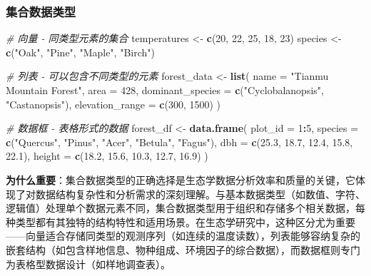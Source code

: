\documentclass[
]{book}
\newenvironment{Shaded}{\begin{snugshade}}{\end{snugshade}}
\newcommand{\AttributeTok}[1]{\textcolor[rgb]{0.13,0.29,0.53}{#1}}
\newcommand{\CommentTok}[1]{\textcolor[rgb]{0.56,0.35,0.01}{\textit{#1}}}
\newcommand{\DecValTok}[1]{\textcolor[rgb]{0.00,0.00,0.81}{#1}}
\newcommand{\FloatTok}[1]{\textcolor[rgb]{0.00,0.00,0.81}{#1}}
\newcommand{\FunctionTok}[1]{\textcolor[rgb]{0.13,0.29,0.53}{\textbf{#1}}}
\newcommand{\NormalTok}[1]{#1}
\newcommand{\OtherTok}[1]{\textcolor[rgb]{0.56,0.35,0.01}{#1}}
\newcommand{\SpecialCharTok}[1]{\textcolor[rgb]{0.81,0.36,0.00}{\textbf{#1}}}
\newcommand{\StringTok}[1]{\textcolor[rgb]{0.31,0.60,0.02}{#1}}
\begin{document}
\hypertarget{ux96c6ux5408ux6570ux636eux7c7bux578b}{%
\subsubsection{集合数据类型}\label{ux96c6ux5408ux6570ux636eux7c7bux578b}}

\begin{Shaded}
\begin{Highlighting}[]
\CommentTok{\# 向量 {-} 同类型元素的集合}
\NormalTok{temperatures }\OtherTok{\textless{}{-}} \FunctionTok{c}\NormalTok{(}\DecValTok{20}\NormalTok{, }\DecValTok{22}\NormalTok{, }\DecValTok{25}\NormalTok{, }\DecValTok{18}\NormalTok{, }\DecValTok{23}\NormalTok{)}
\NormalTok{species }\OtherTok{\textless{}{-}} \FunctionTok{c}\NormalTok{(}\StringTok{"Oak"}\NormalTok{, }\StringTok{"Pine"}\NormalTok{, }\StringTok{"Maple"}\NormalTok{, }\StringTok{"Birch"}\NormalTok{)}

\CommentTok{\# 列表 {-} 可以包含不同类型的元素}
\NormalTok{forest\_data }\OtherTok{\textless{}{-}} \FunctionTok{list}\NormalTok{(}
  \AttributeTok{name =} \StringTok{"Tianmu Mountain Forest"}\NormalTok{,}
  \AttributeTok{area =} \DecValTok{428}\NormalTok{,}
  \AttributeTok{dominant\_species =} \FunctionTok{c}\NormalTok{(}\StringTok{"Cyclobalanopsis"}\NormalTok{, }\StringTok{"Castanopsis"}\NormalTok{),}
  \AttributeTok{elevation\_range =} \FunctionTok{c}\NormalTok{(}\DecValTok{300}\NormalTok{, }\DecValTok{1500}\NormalTok{)}
\NormalTok{)}

\CommentTok{\# 数据框 {-} 表格形式的数据}
\NormalTok{forest\_df }\OtherTok{\textless{}{-}} \FunctionTok{data.frame}\NormalTok{(}
  \AttributeTok{plot\_id =} \DecValTok{1}\SpecialCharTok{:}\DecValTok{5}\NormalTok{,}
  \AttributeTok{species =} \FunctionTok{c}\NormalTok{(}\StringTok{"Quercus"}\NormalTok{, }\StringTok{"Pinus"}\NormalTok{, }\StringTok{"Acer"}\NormalTok{, }\StringTok{"Betula"}\NormalTok{, }\StringTok{"Fagus"}\NormalTok{),}
  \AttributeTok{dbh =} \FunctionTok{c}\NormalTok{(}\FloatTok{25.3}\NormalTok{, }\FloatTok{18.7}\NormalTok{, }\FloatTok{12.4}\NormalTok{, }\FloatTok{15.8}\NormalTok{, }\FloatTok{22.1}\NormalTok{),}
  \AttributeTok{height =} \FunctionTok{c}\NormalTok{(}\FloatTok{18.2}\NormalTok{, }\FloatTok{15.6}\NormalTok{, }\FloatTok{10.3}\NormalTok{, }\FloatTok{12.7}\NormalTok{, }\FloatTok{16.9}\NormalTok{)}
\NormalTok{)}
\end{Highlighting}
\end{Shaded}

\textbf{为什么重要}：集合数据类型的正确选择是生态学数据分析效率和质量的关键，它体现了对数据结构复杂性和分析需求的深刻理解。与基本数据类型（如数值、字符、逻辑值）处理单个数据元素不同，集合数据类型用于组织和存储多个相关数据，每种类型都有其独特的结构特性和适用场景。在生态学研究中，这种区分尤为重要------向量适合存储同类型的观测序列（如连续的温度读数），列表能够容纳复杂的嵌套结构（如包含样地信息、物种组成、环境因子的综合数据），而数据框则专门为表格型数据设计（如样地调查表）。
\end{document}
